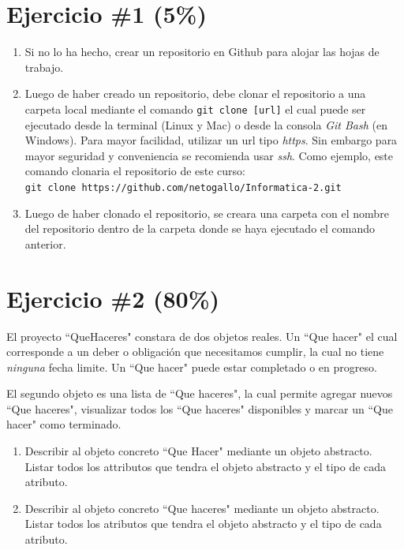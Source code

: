 \documentclass{article}
\begin{document}
\section*{Ejercicio \#1 (5\%)}
\begin{enumerate}
        \item{
                Si no lo ha hecho, crear un repositorio en Github para alojar
                las hojas de trabajo.}
        \item{
                Luego de haber creado un repositorio, debe clonar el repositorio
                a una carpeta local mediante el comando \texttt{git clone [url]} el cual
                puede ser ejecutado desde la terminal (Linux y Mac) o desde la consola
                \emph{Git Bash} (en Windows). Para mayor
                facilidad, utilizar un url tipo \emph{https}. Sin embargo para mayor
                seguridad y conveniencia se recomienda usar \emph{ssh}\cite{GithubSsh}.
                Como ejemplo, este comando clonaria el repositorio de este curso: \\
                \texttt{git clone https://github.com/netogallo/Informatica-2.git}
        }
        \item{
                Luego de haber clonado el repositorio, se creara una carpeta
                con el nombre del repositorio dentro de la carpeta donde se
                haya ejecutado el comando anterior.
        }
\end{enumerate}

\section*{Ejercicio \#2 (80\%)}
El proyecto ``QueHaceres" constara de dos objetos reales. Un
``Que hacer" el cual corresponde a un deber o obligaci\'on que
necesitamos cumplir, la cual no tiene \emph{ninguna} fecha limite.
Un ``Que hacer" puede estar completado o en progreso.

El segundo objeto es una lista de ``Que haceres", la cual permite agregar
nuevos ``Que haceres", visualizar todos los ``Que haceres" disponibles y
marcar un ``Que hacer" como terminado.

\begin{enumerate}
        \item{
                Describir al objeto concreto ``Que Hacer" mediante un objeto
                abstracto. Listar todos los attributos que tendra el objeto
                abstracto y el tipo de cada atributo.}
        \item{
                Describir al objeto concreto ``Que haceres" mediante un objeto
                abstracto. Listar todos los atributos que tendra el objeto abstracto
                y el tipo de cada atributo.
        }
\end{enumerate}
\end{document}

